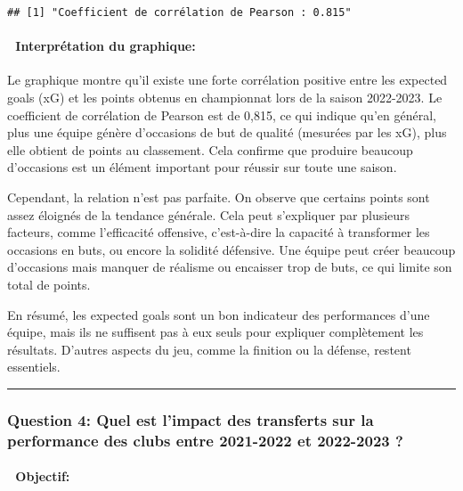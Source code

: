 \documentclass[
]{article}
\begin{document}
\begin{verbatim}
## [1] "Coefficient de corrélation de Pearson : 0.815"
\end{verbatim}

\paragraph{🧠 Interprétation du
graphique:}\label{interpruxe9tation-du-graphique-2}

Le graphique montre qu'il existe une forte corrélation positive entre
les expected goals (xG) et les points obtenus en championnat lors de la
saison 2022-2023. Le coefficient de corrélation de Pearson est de 0,815,
ce qui indique qu'en général, plus une équipe génère d'occasions de but
de qualité (mesurées par les xG), plus elle obtient de points au
classement. Cela confirme que produire beaucoup d'occasions est un
élément important pour réussir sur toute une saison.

Cependant, la relation n'est pas parfaite. On observe que certains
points sont assez éloignés de la tendance générale. Cela peut
s'expliquer par plusieurs facteurs, comme l'efficacité offensive,
c'est-à-dire la capacité à transformer les occasions en buts, ou encore
la solidité défensive. Une équipe peut créer beaucoup d'occasions mais
manquer de réalisme ou encaisser trop de buts, ce qui limite son total
de points.

En résumé, les expected goals sont un bon indicateur des performances
d'une équipe, mais ils ne suffisent pas à eux seuls pour expliquer
complètement les résultats. D'autres aspects du jeu, comme la finition
ou la défense, restent essentiels.

\begin{center}\rule{0.5\linewidth}{0.5pt}\end{center}

\subsubsection{\texorpdfstring{\textbf{Question 4:} Quel est l'impact
des transferts sur la performance des clubs entre 2021-2022 et 2022-2023
?}{Question 4: Quel est l'impact des transferts sur la performance des clubs entre 2021-2022 et 2022-2023 ?}}\label{question-4-quel-est-limpact-des-transferts-sur-la-performance-des-clubs-entre-2021-2022-et-2022-2023}

\paragraph{🎯 Objectif:}\label{objectif-3}
\end{document}
